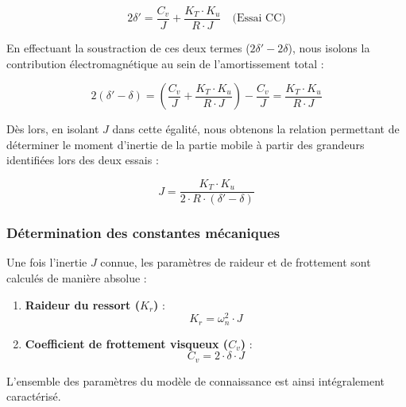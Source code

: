 \begin{equation}
2\delta' = \frac{C_v}{J} + \frac{K_T \cdot K_u}{R \cdot J} \quad \text{(Essai CC)}
\end{equation}

En effectuant la soustraction de ces deux termes ($2\delta' - 2\delta$), nous isolons la contribution électromagnétique au sein de l'amortissement total :

\begin{equation}
2(\delta' - \delta) = \left( \frac{C_v}{J} + \frac{K_T \cdot K_u}{R \cdot J} \right) - \frac{C_v}{J} = \frac{K_T \cdot K_u}{R \cdot J}
\end{equation}

Dès lors, en isolant $J$ dans cette égalité, nous obtenons la relation permettant de déterminer le moment d'inertie de la partie mobile à partir des grandeurs identifiées lors des deux essais :

\begin{equation}
J = \frac{K_T \cdot K_u}{2 \cdot R \cdot (\delta' - \delta)}
\label{eq:calc_J}
\end{equation}


\subsubsection{Détermination des constantes mécaniques}

Une fois l'inertie $J$ connue, les paramètres de raideur et de frottement sont calculés de manière absolue :
\begin{enumerate}
    \item \textbf{Raideur du ressort ($K_r$)} : 
    \begin{equation}
    K_r = \omega_n^2 \cdot J
    \label{eq:calc_Kr}
    \end{equation}
    \item \textbf{Coefficient de frottement visqueux ($C_v$)} :
    \begin{equation}
    C_v = 2 \cdot \delta \cdot J
    \label{eq:calc_Cv}
    \end{equation}
\end{enumerate}

L'ensemble des paramètres du modèle de connaissance est ainsi intégralement caractérisé.



\newpage